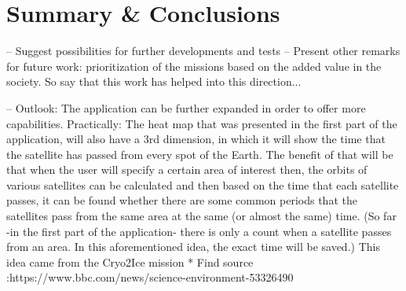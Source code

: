 \chapter{Summary \& Conclusions}
\label{chap:5}

--  Suggest possibilities for further developments and tests
--  Present other remarks for future work: prioritization of the missions based on the added value in the society. So say that this work has helped into this direction...

-- Outlook:
The application can be further expanded in order to offer more capabilities. Practically: The heat map that was presented in the first part of the application, will also have a 3rd dimension, in which it will show the time that the satellite has passed from every spot of the Earth. The benefit of that will be that when the user will specify a certain area of interest then, the orbits of various satellites can be calculated and then based on the time that each satellite passes, it can be found whether there are some common periods that the satellites pass from the same area at the same (or almost the same) time. 
(So far -in the first part of the application- there is only a count when a satellite passes from an area. In this aforementioned idea, the exact time will be saved.)
This idea came from the Cryo2Ice mission * Find source :https://www.bbc.com/news/science-environment-53326490